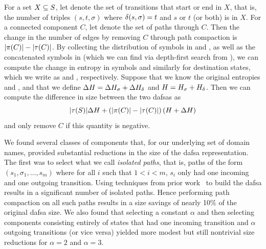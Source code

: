 \setlength{\abovedisplayskip}{3pt}
\setlength{\belowdisplayskip}{3pt}

For a set $X \subseteq S$, let  denote the set of transitions
that start or end in $X$, that is, the number of triples $(s, t, \sigma)$ where
$\delta(s, \sigma) = t$ and $s$ or $t$ (or both) is in $X$. For a connected
component $C$, let  denote the set of paths through $C$. Then the
change in the number of edges by removing $C$ through path compaction is
$|\pi(C)| - |\tau(C)|$. By collecting the distribution of symbols in
 and , as well as the concatenated symbols in
 (which we can find via depth-first search from ), we
can compute the change in entropy in symbols and similarly for destination
states, which we write as \symboldh and \destdh, respectively. Suppose that we know the
original entropies \symbolh and \desth, and that we define $\Delta H = \Delta H_\sigma +
\Delta H_\delta$ and $H = H_\sigma + H_\delta$. Then we can compute the difference in
size between the two \acp{dafsa} as
\begin{equation}
  |\tau(S)| \Delta H + \left(|\pi(C)| - |\tau(C)|\right)
  (H + \Delta H)
\end{equation}
and only remove $C$ if this quantity is negative.

We found several classes of components that, for our underlying set of domain
names, provided substantial reductions in the size of the \ac{dafsa}
representation. The first was to select what we call \emph{isolated paths}, that
is, paths of the form $(s_1, \sigma_1, \ldots, s_m)$ where for all $i$ such that
$1 < i < m$, $s_i$ only had one incoming and one outgoing transition. Using
techniques from prior work~\cite{daciuk2000incremental} to build the \ac{dafsa}
results in a significant number of isolated paths. Hence performing path
compaction on all such paths results in a size savings of nearly 10\% of the
original \ac{dafsa} size. We also found that selecting a constant $\alpha$ and
then selecting components consisting entirely of states that had one incoming
transition and $\alpha$ outgoing transitions (or vice versa) yielded more modest
but still nontrivial size reductions for $\alpha = 2$ and $\alpha = 3$.

